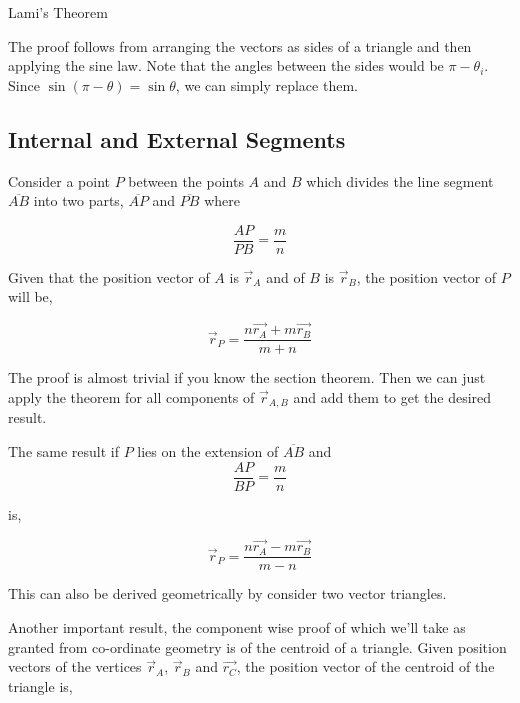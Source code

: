 \begin{marginfigure}
    \centering
    \caption{Lami's Theorem}
    \label{fig: lami}
\end{marginfigure}

The proof follows from arranging the vectors as sides of a triangle and then applying the 
sine law. Note that the angles between the sides would be \(\pi - \theta_i\). Since 
\(\sin(\pi-\theta) = \sin\theta\), we can simply replace them. 

\subsection{Internal and External Segments}

Consider a point \(P\) between the points \(A\) and \(B\) which divides the line segment \(\overline{AB}\) into 
two parts, \(\overline{AP}\) and \(\overline{PB}\) where

\begin{equation*}
    \frac{AP}{PB} = \frac{m}{n}
\end{equation*}

\begin{theorem}
    Given that the position vector of \(A\) is \(\vec{r}_A\) and of \(B\) is 
    \(\vec{r}_B\), the position vector of \(P\) will be,

    \begin{equation}
        \vec{r}_P = \frac{n\vec{r_A} + m\vec{r_B}}{m+n}
    \end{equation}
\end{theorem}

The proof is almost trivial if you know the section theorem. Then we can 
just apply the theorem for all components of \(\vec{r}_{A,B}\) and add them to 
get the desired result. 

The same result if \(P\) lies on the extension of \(\overline{AB}\) and 
\begin{equation*}
    \frac{AP}{BP} = \frac{m}{n}
\end{equation*}

is,

\begin{equation}
    \boxed{\vec{r}_P = \frac{n\vec{r_A} - m\vec{r_B}}{m-n}}
\end{equation}

This can also be derived geometrically by consider two vector triangles. 

Another important result, the component wise proof of which we'll take as granted from 
co-ordinate geometry is of the centroid of a triangle. Given position vectors 
of the vertices \(\vec{r}_A\), \(\vec{r}_B\) and \(\vec{r_C}\), the position 
vector of the centroid of the triangle is,

